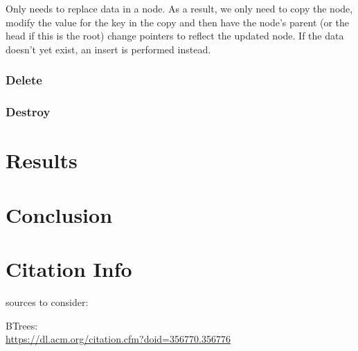 \documentclass[twocolumn]{article}
\begin{document}
Only needs to replace data in a node. As a result, we only need to copy the
node, modify the value for the key in the copy and then have the node's parent
(or the head if this is the root) change pointers to reflect the updated node.
If the data doesn't yet exist, an insert is performed instead.

\subsubsection{Delete}

\subsubsection{Destroy}

\section{Results}

\section{Conclusion}

\section{Citation Info}


sources to consider:

BTrees:\\
\url{https://dl.acm.org/citation.cfm?doid=356770.356776}
\end{document}
